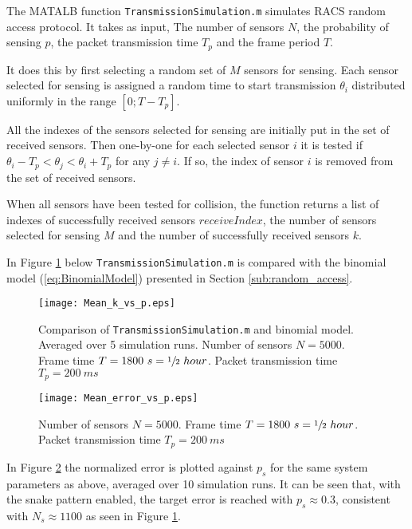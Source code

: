 \documentclass[Main]{subfiles}
\begin{document}
		The MATALB function \texttt{TransmissionSimulation.m} simulates RACS random access protocol.
		It takes as input, The number of sensors $N$, the probability of sensing $p$, the packet transmission time $T_p$ and the frame period $T$.

		It does this by first selecting a random set of $M$ sensors for sensing.
		Each sensor selected for sensing is assigned a random time to start transmission $\theta_i$ distributed uniformly in the range $[0 ; T - T_p]$.

		All the indexes of the sensors selected for sensing are initially put in the set of received sensors.
		Then one-by-one for each selected sensor $i$ it is tested if 
		$\theta_i - T_p < \theta_j < \theta_i + T_p$
		for any
		$j \neq i$.
		If so, the index of sensor $i$ is removed from the set of received sensors.

		When all sensors have been tested for collision, the function returns a list of indexes of successfully received sensors $receiveIndex$, the number of sensors selected for sensing $M$ and the number of successfully received sensors $k$.

		In Figure \ref{fig:Mean_k_vs_p} below \texttt{TransmissionSimulation.m} is compared with the binomial model (\ref{eq:BinomialModel}) presented in Section \ref{sub:random_access}.

		\begin{figure}[H]
			\centering 
			\texttt{[image: Mean\_k\_vs\_p.eps]}
			\caption{Comparison of \texttt{TransmissionSimulation.m} and binomial model. Averaged over 5 simulation runs.
			Number of sensors $N = 5000$.
			Frame time $T = 1800\ s = \sfrac{1}{2}\ hour$.
			Packet transmission time $T_p = 200\ ms$}
			\label{fig:Mean_k_vs_p}
		\end{figure}

		\begin{figure}[H]
			\centering 
			\texttt{[image: Mean\_error\_vs\_p.eps]}
			\caption{
			Number of sensors $N = 5000$.
			Frame time $T = 1800\ s = \sfrac{1}{2}\ hour$.
			Packet transmission time $T_p = 200\ ms$}
			\label{fig:Mean_error_vs_p}
		\end{figure}
	
		In Figure \ref{fig:Mean_error_vs_p} the normalized error is plotted against $p_s$ for the same system parameters as above, averaged over 10 simulation runs.
		It can be seen that, with the snake pattern enabled, the target error is reached with $p_s \approx 0.3$, consistent with $N_s \approx 1100$ as seen in Figure \ref{fig:Mean_k_vs_p}.
\end{document}
